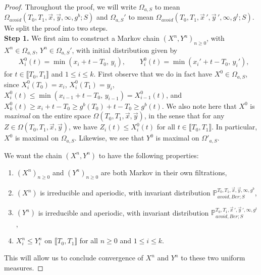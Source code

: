 \begin{proof} Throughout the proof, we will write $\Omega_{a,S}$ to mean $\Omega_{avoid}(T_0,T_1,\vec{x},\vec{y},\infty,g^b;S)$ and $\Omega_{a,S}'$ to mean $\Omega_{avoid}(T_0,T_1,\vec{x}\,',\vec{y}\,',\infty,g^t;S)$. We split the proof into two steps.\\
	
	\noindent\textbf{Step 1.} We first aim to construct a Markov chain $(X^n,Y^n)_{n\geq 0}$, with $X^n\in \Omega_{a,S}$, $Y^n\in \Omega_{a,S}'$, with initial distribution given by
	\begin{align*}
	& X^0_i(t) = \min(x_i+t-T_0, \, y_i), \qquad Y^0_i(t) = \min(x_i'+t-T_0, \, y_i'),
	\end{align*}
	for $t\in\llbracket T_0, T_1\rrbracket$ and $1\leq i\leq k$. First observe that we do in fact have $X^0 \in \Omega_{a,S}$, since $X_i^0(T_0) = x_i$, $X_i^0(T_1) = y_i$, $X_i^0(t) \leq \min(x_{i-1} + t - T_0, \, y_{i-1}) = X_{i-1}^0(t)$, and $X_k^0(t) \geq x_i + t - T_0 \geq g^b(T_0) + t - T_0 \geq g^b(t)$. We also note here that $X^0$ is \textit{maximal} on the entire space $\Omega(T_0,T_1,\vec{x},\vec{y})$, in the sense that for any $Z\in\Omega(T_0,T_1,\vec{x},\vec{y})$, we have $Z_i(t) \leq X^0_i(t)$ for all $t\in\llbracket T_0, T_1 \rrbracket$. In particular, $X^0$ is maximal on $\Omega_{a,S}$. Likewise, we see that $Y^0$ is maximal on $\Omega'_{a,S}$.
	
	We want the chain $(X^n,Y^n)$ to have the following properties: 
	\begin{enumerate}[label=(\arabic*)]
		
		\item $(X^n)_{n\geq 0}$ and $(Y^n)_{n\geq 0}$ are both Markov in their own filtrations,
		
		\item $(X^n)$ is irreducible and aperiodic, with invariant distribution $\mathbb{P}_{avoid,Ber;S}^{T_0,T_1,\vec{x},\vec{y},\infty,g^b}$,
		
		\item $(Y^n)$ is irreducible and aperiodic, with invariant distribution $\mathbb{P}_{avoid,Ber;S}^{T_0,T_1,\vec{x}\,',\vec{y}\,',\infty,g^t}$,
		
		\item $X^n_i\leq Y^n_i$ on $\llbracket T_0, T_1 \rrbracket$ for all $n\geq 0$ and $1\leq i \leq k$.
		
	\end{enumerate}
	
	\noindent This will allow us to conclude convergence of $X^n$ and $Y^n$ to these two uniform measures.
	

\end{proof}
